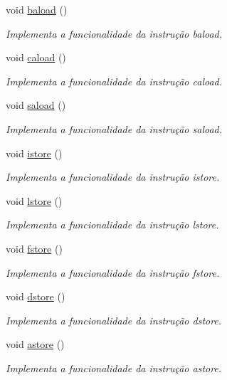 \begin{DoxyCompactItemize}
void \hyperlink{classOperations_afdf1759637e332569a2b2b17067e05f0}{baload} ()
\begin{DoxyCompactList}\small\item\em Implementa a funcionalidade da instrução baload. \end{DoxyCompactList}\item 
void \hyperlink{classOperations_a4bb55ffc2ba79a76a019a0c02d29d7f9}{caload} ()
\begin{DoxyCompactList}\small\item\em Implementa a funcionalidade da instrução caload. \end{DoxyCompactList}\item 
void \hyperlink{classOperations_ac97743869c458c3ffcda48383308e9b4}{saload} ()
\begin{DoxyCompactList}\small\item\em Implementa a funcionalidade da instrução saload. \end{DoxyCompactList}\item 
void \hyperlink{classOperations_a1547cbd0fa84e551f218d472a5187efa}{istore} ()
\begin{DoxyCompactList}\small\item\em Implementa a funcionalidade da instrução istore. \end{DoxyCompactList}\item 
void \hyperlink{classOperations_a233917ec136fa6ce064f04b410e15f87}{lstore} ()
\begin{DoxyCompactList}\small\item\em Implementa a funcionalidade da instrução lstore. \end{DoxyCompactList}\item 
void \hyperlink{classOperations_a42a0b3220b593059320cf7d5a5eed6e2}{fstore} ()
\begin{DoxyCompactList}\small\item\em Implementa a funcionalidade da instrução fstore. \end{DoxyCompactList}\item 
void \hyperlink{classOperations_a83fb57afed30b1223f8485492f9d9958}{dstore} ()
\begin{DoxyCompactList}\small\item\em Implementa a funcionalidade da instrução dstore. \end{DoxyCompactList}\item 
void \hyperlink{classOperations_aa414424bd203fb9788712fd2e74c3a32}{astore} ()
\begin{DoxyCompactList}\small\item\em Implementa a funcionalidade da instrução astore. \end{DoxyCompactList}\item 

\end{DoxyCompactItemize}
